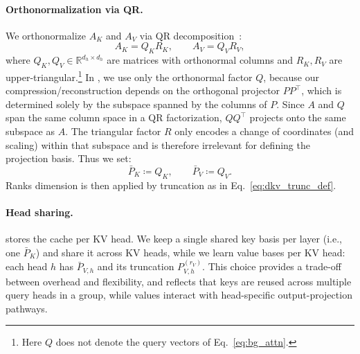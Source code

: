 \paragraph{Orthonormalization via QR.}
We orthonormalize $A_K$ and $A_V$ via QR decomposition~\cite{bookqr}:
\begin{equation}
A_K = Q_K R_K,\qquad A_V = Q_V R_V,
\label{eq:dkv_qr}
\end{equation}
where $Q_K,Q_V\in\mathbb{R}^{d_h\times d_h}$ are matrices with orthonormal columns and $R_K,R_V$ are upper-triangular.\footnote{Here $Q$ does not denote the query vectors of Eq.~\ref{eq:bg_attn}.}
In \methodname, we use only the orthonormal factor $Q$, because our compression/reconstruction depends on the orthogonal projector $P P^\top$, which is determined solely by the subspace spanned by the columns of $P$.
Since $A$ and $Q$ span the same column space in a QR factorization, $Q Q^\top$ projects onto the same subspace as $A$.
The triangular factor $R$ only encodes a change of coordinates (and scaling) within that subspace and is therefore irrelevant for defining the projection basis.
Thus we set:
\begin{equation}
\bar{P}_K \coloneq Q_K,
\qquad
\bar{P}_V \coloneq Q_V.
\label{eq:dkv_bases}
\end{equation}
Ranks dimension is then applied by truncation as in Eq.~\ref{eq:dkv_trunc_def}.
%
%
%
%
\paragraph{Head sharing.}\label{par:head_sharing}
\methodname stores the cache per KV head.
We keep a single shared key basis per layer (i.e., one $\bar P_K$) and share it across KV heads, while we learn value bases per KV head: each head $h$ has $\bar P_{V,h}$ and its truncation $P_{V,h}^{(r_V)}$.
This choice provides a trade-off between overhead and flexibility, and reflects that keys are reused across multiple query heads in a group, while values interact with head-specific output-projection pathways.
%

